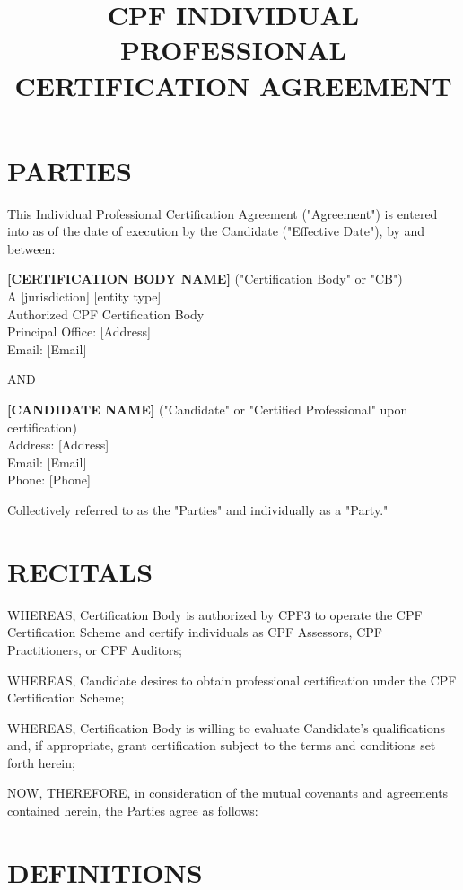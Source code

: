 \documentclass[11pt,a4paper]{article}
\title{\textbf{CPF INDIVIDUAL PROFESSIONAL\\CERTIFICATION AGREEMENT}}
\author{}
\date{}
\begin{document}
\maketitle

\section*{PARTIES}

This Individual Professional Certification Agreement ("Agreement") is entered into as of the date of execution by the Candidate ("Effective Date"), by and between:

\textbf{[CERTIFICATION BODY NAME]} ("Certification Body" or "CB")\\
A [jurisdiction] [entity type]\\
Authorized CPF Certification Body\\
Principal Office: [Address]\\
Email: [Email]

AND

\textbf{[CANDIDATE NAME]} ("Candidate" or "Certified Professional" upon certification)\\
Address: [Address]\\
Email: [Email]\\
Phone: [Phone]

Collectively referred to as the "Parties" and individually as a "Party."

\section*{RECITALS}

WHEREAS, Certification Body is authorized by CPF3 to operate the CPF Certification Scheme and certify individuals as CPF Assessors, CPF Practitioners, or CPF Auditors;

WHEREAS, Candidate desires to obtain professional certification under the CPF Certification Scheme;

WHEREAS, Certification Body is willing to evaluate Candidate's qualifications and, if appropriate, grant certification subject to the terms and conditions set forth herein;

NOW, THEREFORE, in consideration of the mutual covenants and agreements contained herein, the Parties agree as follows:

\section{DEFINITIONS}
\end{document}
